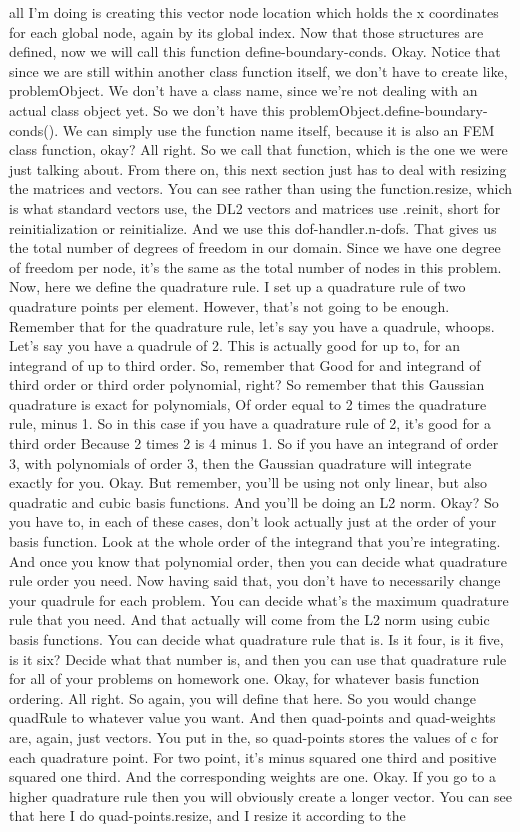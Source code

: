 \documentclass[10pt]{article}
\begin{document}
{all I'm doing is creating this vector node location which holds the x coordinates for each global node, again by its global index. Now that those structures are defined, now we will call this function define-boundary-conds. Okay. Notice that since we are still within another class function itself, we don't have to create like, problemObject. We don't have a class name, since we're not dealing with an actual class object yet. So we don't have this problemObject.define-boundary-conds(). We can simply use the function name itself, because it is also an FEM class function, okay? All right. So we call that function, which is the one we were just talking about. From there on, this next section just has to deal with resizing the matrices and vectors. You can see rather than using the function.resize, which is what standard vectors use, the DL2 vectors and matrices use .reinit, short for reinitialization or reinitialize. And we use this dof-handler.n-dofs. That gives us the total number of degrees of freedom in our domain. Since we have one degree of freedom per node, it's the same as the total number of nodes in this problem. Now, here we define the quadrature rule. I set up a quadrature rule of two quadrature points per element. However, that's not going to be enough. Remember that for the quadrature rule, let's say you have a quadrule, whoops. Let's say you have a quadrule of 2. This is actually good for up to, for an integrand of up to third order. So, remember that Good for and integrand of third order or third order polynomial, right? So remember that this Gaussian quadrature is exact for polynomials, Of order equal to 2 times the quadrature rule, minus 1. So in this case if you have a quadrature rule of 2, it's good for a third order Because 2 times 2 is 4 minus 1. So if you have an integrand of order 3, with polynomials of order 3, then the Gaussian quadrature will integrate exactly for you. Okay. But remember, you'll be using not only linear, but also quadratic and cubic basis functions. And you'll be doing an L2 norm. Okay? So you have to, in each of these cases, don't look actually just at the order of your basis function. Look at the whole order of the integrand that you're integrating. And once you know that polynomial order, then you can decide what quadrature rule order you need. Now having said that, you don't have to necessarily change your quadrule for each problem. You can decide what's the maximum quadrature rule that you need. And that actually will come from the L2 norm using cubic basis functions. You can decide what quadrature rule that is. Is it four, is it five, is it six? Decide what that number is, and then you can use that quadrature rule for all of your problems on homework one. Okay, for whatever basis function ordering. All right. So again, you will define that here. So you would change quadRule to whatever value you want. And then quad-points and quad-weights are, again, just vectors. You put in the, so quad-points stores the values of c for each quadrature point. For two point, it's minus squared one third and positive squared one third. And the corresponding weights are one. Okay. If you go to a higher quadrature rule then you will obviously create a longer vector. You can see that here I do quad-points.resize, and I resize it according to the }
\end{document}

